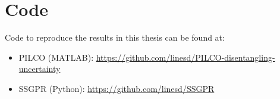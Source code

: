 
\chapter{Code}
\label{A:code}
Code to reproduce the results in this thesis can be found at:
\begin{itemize}
    \item PILCO (MATLAB): \url{https://github.com/linesd/PILCO-disentangling-uncertainty}
    \item SSGPR (Python): \url{https://github.com/linesd/SSGPR}
\end{itemize}